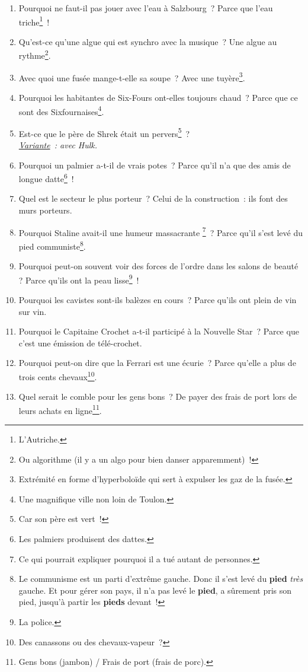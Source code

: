 \documentclass[10pt,a5paper,fullpage]{book}
\begin{document}
\begin{enumerate}
		\item Pourquoi ne faut-il pas jouer avec l’eau à Salzbourg~? Parce que l’eau triche\footnote{L'Autriche.}~!
		\item Qu’est-ce qu’une algue qui est synchro avec la musique~? Une algue au rythme\footnote{Ou algorithme (il y a un algo pour bien danser apparemment)~!}.
		\item Avec quoi une fusée mange-t-elle sa soupe~? Avec une tuyère\footnote{Extrémité en forme d’hyperboloïde qui sert à expulser les gaz de la fusée.}.
		\item Pourquoi les habitantes de Six-Fours ont-elles toujours chaud~? Parce que ce sont des Sixfournaises\footnote{Une magnifique ville non loin de Toulon.}.
		\item Est-ce que le père de Shrek était un pervers\footnote{Car son père est vert~!}~? \\\textit{\underline{Variante}~: avec Hulk.}
		\item Pourquoi un palmier a-t-il de vrais potes~? Parce qu’il n’a que des amis de longue datte\footnote{Les palmiers produisent des dattes.}~!
		\item Quel est le secteur le plus porteur~? Celui de la construction~: ils font des murs porteurs.
		\item Pourquoi Staline avait-il une humeur massacrante \footnote{Ce qui pourrait expliquer pourquoi il a tué autant de personnes.}~? Parce qu’il s’est levé du pied communiste\footnote{Le communisme est un parti d'extrême gauche. Donc il s'est levé du \textbf{pied} \textit{très} gauche. Et pour gérer son pays, il n'a pas levé le \textbf{pied}, a sûrement pris son pied, jusqu'à partir les \textbf{pieds} devant~!}.
		\item Pourquoi peut-on souvent voir des forces de l'ordre dans les salons de beauté ? Parce qu'ils ont la peau lisse\footnote{La police.}~!
		\item Pourquoi les cavistes sont-ils balèzes en cours~? Parce qu’ils ont plein de vin sur vin. 
		\item Pourquoi le Capitaine Crochet a-t-il participé à la Nouvelle Star~? Parce que c’est une émission de télé-crochet.
		\item Pourquoi peut-on dire que la Ferrari est une écurie~? Parce qu’elle a plus de trois cents chevaux\footnote{Des canassons ou des chevaux-vapeur~?}.
		\item Quel serait le comble pour les gens bons~? De payer des frais de port lors de leurs achats en ligne\footnote{Gens bons (jambon) / Frais de port (frais de porc).}.

\end{enumerate}
\end{document}
